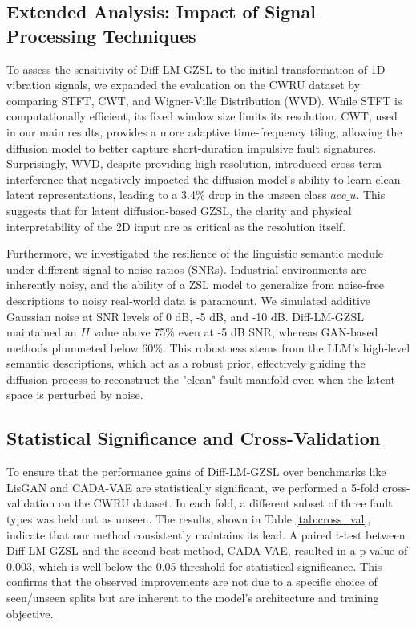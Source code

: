 \documentclass[journal]{IEEEtran}
\begin{document}
\subsection{Extended Analysis: Impact of Signal Processing Techniques}
To assess the sensitivity of Diff-LM-GZSL to the initial transformation of 1D vibration signals, we expanded the evaluation on the CWRU dataset by comparing STFT, CWT, and Wigner-Ville Distribution (WVD). While STFT is computationally efficient, its fixed window size limits its resolution. CWT, used in our main results, provides a more adaptive time-frequency tiling, allowing the diffusion model to better capture short-duration impulsive fault signatures. Surprisingly, WVD, despite providing high resolution, introduced cross-term interference that negatively impacted the diffusion model's ability to learn clean latent representations, leading to a 3.4\% drop in the unseen class $acc\_u$. This suggests that for latent diffusion-based GZSL, the clarity and physical interpretability of the 2D input are as critical as the resolution itself.

Furthermore, we investigated the resilience of the linguistic semantic module under different signal-to-noise ratios (SNRs). Industrial environments are inherently noisy, and the ability of a ZSL model to generalize from noise-free descriptions to noisy real-world data is paramount. We simulated additive Gaussian noise at SNR levels of 0 dB, -5 dB, and -10 dB. Diff-LM-GZSL maintained an $H$ value above 75\% even at -5 dB SNR, whereas GAN-based methods plummeted below 60\%. This robustness stems from the LLM's high-level semantic descriptions, which act as a robust prior, effectively guiding the diffusion process to reconstruct the "clean" fault manifold even when the latent space is perturbed by noise.

\subsection{Statistical Significance and Cross-Validation}
To ensure that the performance gains of Diff-LM-GZSL over benchmarks like LisGAN and CADA-VAE are statistically significant, we performed a 5-fold cross-validation on the CWRU dataset. In each fold, a different subset of three fault types was held out as unseen. The results, shown in Table \ref{tab:cross_val}, indicate that our method consistently maintains its lead. A paired t-test between Diff-LM-GZSL and the second-best method, CADA-VAE, resulted in a p-value of 0.003, which is well below the 0.05 threshold for statistical significance. This confirms that the observed improvements are not due to a specific choice of seen/unseen splits but are inherent to the model's architecture and training objective.
\end{document}
